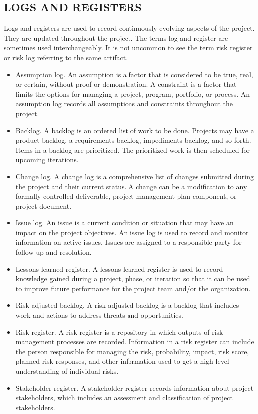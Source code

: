 \documentclass[11pt]{article}
\begin{document}
\subsection{LOGS AND REGISTERS}
\label{sec:org66a1088}
Logs and registers are used to record continuously evolving aspects of the project. They are updated throughout the project. The terms log and register are sometimes used interchangeably. It is not uncommon to see the term risk register or risk log referring to the same artifact.
\begin{itemize}
\item Assumption log. An assumption is a factor that is considered to be true, real, or certain, without proof or demonstration. A constraint is a factor that limits the options for managing a project, program, portfolio, or process. An assumption log records all assumptions and constraints throughout the project.
\item Backlog. A backlog is an ordered list of work to be done. Projects may have a product backlog, a requirements backlog, impediments backlog, and so forth. Items in a backlog are prioritized. The prioritized work is then scheduled for upcoming iterations.
\item Change log. A change log is a comprehensive list of changes submitted during the project and their current status. A change can be a modification to any formally controlled deliverable, project management plan component, or project document.
\item Issue log. An issue is a current condition or situation that may have an impact on the project objectives. An issue log is used to record and monitor information on active issues. Issues are assigned to a responsible party for follow up and resolution.
\item Lessons learned register. A lessons learned register is used to record knowledge gained during a project, phase, or iteration so that it can be used to improve future performance for the project team and/or the organization.
\item Risk-adjusted backlog. A risk-adjusted backlog is a backlog that includes work and actions to address threats and opportunities.
\item Risk register. A risk register is a repository in which outputs of risk management processes are recorded. Information in a risk register can include the person responsible for managing the risk, probability, impact, risk score, planned risk responses, and other information used to get a high-level understanding of individual risks.
\item Stakeholder register. A stakeholder register records information about project stakeholders, which includes an assessment and classification of project stakeholders.
\end{itemize}
\end{document}

